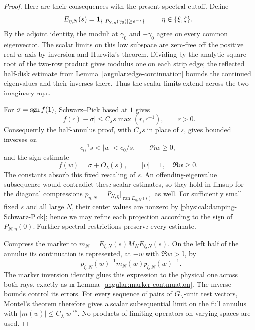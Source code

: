 \begin{proof}
Here are their consequences with the present spectral cutoff. Define
\[
 E_{\eta,N}(s)=
 \mathbf 1_{\{|P_{N,\eta}(\gamma_0)|\ge e^{-s}\}},\qquad
 \eta\in\{\xi,\zeta\}.
\]
By the adjoint identity, the moduli at $\gamma_0$ and $-\gamma_0$
agree on every common eigenvector. The scalar limits on this low
subspace are zero-free off the positive real $w$ axis by inversion
and Hurwitz's theorem. Dividing by the analytic square root of the
two-row product gives modulus one on each strip edge; the reflected
half-disk estimate from Lemma~\ref{angular:edge-continuation} bounds
the continued eigenvalues and their inverses there. Thus the scalar
limits extend across the two imaginary rays.

For $\sigma=\operatorname{sgn} f(1)$, Schwarz--Pick based at $1$ gives
\begin{equation}\label{physical:radial-sign-bound}
 |f(r)-\sigma|\le C_\lambda s\max(r,r^{-1}),\qquad r>0.
\end{equation}
Consequently the half-annulus proof, with $C_\lambda s$ in place of
$s$, gives bounded inverses on
\begin{equation}\label{physical:low-band-annulus}
 c_0^{-1}s<|w|<c_0/s,\qquad \Re w\ge0,
\end{equation}
and the sign estimate
\begin{equation}\label{physical:unit-semicircle-sign}
 f(w)=\sigma+O_\lambda(s),\qquad |w|=1,\quad\Re w\ge0.
\end{equation}
The constants absorb this fixed rescaling of $s$. An offending-eigenvalue
subsequence would contradict these scalar estimates, so they hold in
limsup for the diagonal compressions
$p_{\eta,N}=P_{N,\eta}|_{\operatorname{ran}E_{\eta,N}(s)}$ as well.
For sufficiently small fixed $s$ and all large $N$, their center
values are nonzero by \eqref{physical:damping-Schwarz-Pick}; hence we
may refine each projection according to the sign of $P_{N,\eta}(0)$.
Further spectral restrictions preserve every estimate.

Compress the marker to
$m_N=E_{\xi,N}(s)M_NE_{\zeta,N}(s)$. On the left half of the annulus
its continuation is represented, at $-w$ with $\Re w>0$, by
\begin{equation}\label{physical:marker-continuation}
 -p_{\xi,N}(w)^{-1}m_N(w)p_{\zeta,N}(w)^{-1}.
\end{equation}
The marker inversion identity glues this expression to the physical
one across both rays, exactly as in
Lemma~\ref{angular:marker-continuation}. The inverse bounds control
its errors. For every sequence of pairs of $G_N$-unit test vectors,
Montel's theorem therefore gives a scalar subsequential limit on the
full annulus with $|m(w)|\le C_\lambda|w|^{\tau\rho}$. No products
of limiting operators on varying spaces are used.


\end{proof}
